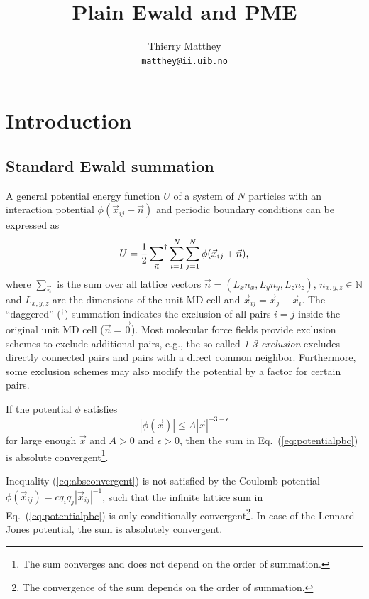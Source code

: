 \documentclass[11pt]{article}
\author{Thierry Matthey\\{\tt matthey@ii.uib.no}}
\title{Plain Ewald and PME}
\begin{document}
\maketitle

\section{Introduction}
\subsection{Standard Ewald summation\label{sec:ewald}}

A general potential energy function $U$ of a system of $N$ particles with an 
interaction potential  $\phi (\vec{x}_{ij}+\vec{n})$ and periodic boundary
conditions can be expressed as 
\begin{equation}
 U = \frac{1}{2}\sideset{}{^\dag}\sum_{\vec{n}} \sum_{i=1}^{N} \sum_{j=1}^{N} 
\phi (\vec{x}_{ij}+\vec{n}), 
\label{eq:potentialpbc}
\end{equation}
where $\sum_{\vec{n}}$ is the sum over all lattice vectors 
$\vec{n} = (L_{x}n_{x},L_{y}n_{y},L_{z}n_{z})$, $n_{x,y,z} \in \mathbb{N}$ and
$L_{x,y,z}$ are the dimensions of the unit MD cell and
$\vec{x}_{ij}=\vec{x}_{j}-\vec{x}_{i}$. The ``daggered''
($^\dag$) summation indicates the exclusion of all pairs $i=j$ inside the
original unit MD cell ($\vec{n} = \vec{0}$). Most molecular force fields
provide exclusion schemes to exclude additional pairs, e.g., the
so-called {\it 1-3 exclusion} excludes directly connected pairs and
pairs with a direct common neighbor. Furthermore, some exclusion schemes
may also modify the potential by a factor for certain pairs.

If the potential $\phi$ satisfies 
\begin{equation}
| \phi(\vec{x}) | \leq A|\vec{x}|^{-3 - \epsilon}
\label{eq:absconvergent}
\end{equation}
for large enough $\vec{x}$ and  $A > 0$ and $\epsilon > 0$, then
the sum in Eq.\ (\ref{eq:potentialpbc}) is absolute
convergent\footnote{The sum converges and does not depend on the order of
summation.}.

Inequality (\ref{eq:absconvergent}) is not satisfied by the Coulomb
potential $\phi(\vec{x}_{ij}) = cq_iq_j |\vec{x}_{ij}|^{-1}$, such that the
infinite lattice sum in Eq.\ (\ref{eq:potentialpbc}) is only conditionally
convergent\footnote{The convergence of the sum depends on the order of
summation.}. In case of the Lennard-Jones potential, the
sum is absolutely convergent.
\end{document}
